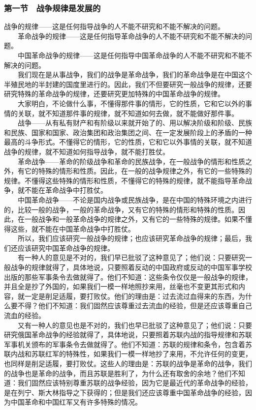 \documentclass[cn,11pt,chinese]{elegantbook}
\def\myformat#1{\hfil\hfil #1}
\begin{document}
\subsubsection*{\myformat{第一节　战争规律是发展的}}
战争的规律——这是任何指导战争的人不能不研究和不能不解决的问题。\\
　　革命战争的规律——这是任何指导革命战争的人不能不研究和不能不解决的问题。\\
　　中国革命战争的规律——这是任何指导中国革命战争的人不能不研究和不能不解决的问题。\\
　　我们现在是从事战争，我们的战争是革命战争，我们的革命战争是在中国这个半殖民地的半封建的国度里进行的。因此，我们不但要研究一般战争的规律，还要研究特殊的革命战争的规律，还要研究更加特殊的中国革命战争的规律。\\
　　大家明白，不论做什么事，不懂得那件事的情形，它的性质，它和它以外的事情的关联，就不知道那件事的规律，就不知道如何去做，就不能做好那件事。\\
　　战争——从有私有财产和有阶级以来就开始了的、用以解决阶级和阶级、民族和民族、国家和国家、政治集团和政治集团之间、在一定发展阶段上的矛盾的一种最高的斗争形式。不懂得它的情形，它的性质，它和它以外事情的关联，就不知道战争的规律，就不知道如何指导战争，就不能打胜仗。\\
　　革命战争——革命的阶级战争和革命的民族战争，在一般战争的情形和性质之外，有它的特殊的情形和性质。因此，在一般的战争规律之外，有它的一些特殊的规律。不懂得这些特殊的情形和性质，不懂得它的特殊的规律，就不能指导革命战争，就不能在革命战争中打胜仗。\\
　　中国革命战争——不论是国内战争或民族战争，是在中国的特殊环境之内进行的，比较一般的战争，一般的革命战争，又有它的特殊的情形和特殊的性质。因此，在一般战争和一般革命战争的规律之外，又有它的一些特殊的规律。如果不懂得这些，就不能在中国革命战争中打胜仗。\\
　　所以，我们应该研究一般战争的规律；也应该研究革命战争的规律；最后，我们还应该研究中国革命战争的规律。\\
　　有一种人的意见是不对的，我们早已批驳了这种意见了；他们说：只要研究一般战争的规律就得了，具体地说，只要照着反动的中国政府或反动的中国军事学校出版的那些军事条令去做就得了。他们不知道：这些条令仅仅是一般战争的规律，并且全是抄了外国的，如果我们一模一样地照抄来用，丝毫也不变更其形式和内容，就一定是削足适履，要打败仗。他们的理由是：过去流过血得来的东西，为什么要不得？他们不知道：我们固然应该尊重过去流血的经验，但是还应该尊重自己流血的经验。\\
　　又有一种人的意见也是不对的，我们也早已批驳了这种意见了；他们说：只要研究俄国革命战争的经验就得了，具体地说，只要照着苏联内战的指导规律和苏联军事机关颁布的军事条令去做就得了。他们不知道：苏联的规律和条令，包含着苏联内战和苏联红军的特殊性，如果我们一模一样地抄了来用，不允许任何的变更，也同样是削足适履，要打败仗。这些人的理由是：苏联的战争是革命的战争，我们的战争也是革命的战争，而且苏联是胜利了，为什么还有取舍的余地？他们不知道：我们固然应该特别尊重苏联的战争经验，因为它是最近代的革命战争的经验，是在列宁、斯大林指导之下获得的；但是我们还应该尊重中国革命战争的经验，因为中国革命和中国红军又有许多特殊的情况。\\
\end{document}

